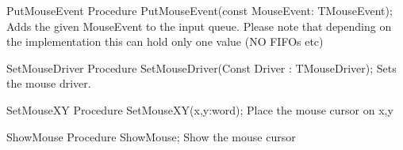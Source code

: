 \begin{procedure}{PutMouseEvent}
\Declaration
Procedure PutMouseEvent(const MouseEvent: TMouseEvent);
\Description
 { Adds the given MouseEvent to the input queue. Please note that depending on  the implementation this can hold only one value (NO FIFOs etc) }
\Errors
\SeeAlso
\end{procedure}

\begin{procedure}{SetMouseDriver}
\Declaration
Procedure SetMouseDriver(Const Driver : TMouseDriver);
\Description
 { Sets the mouse driver. }
\Errors
\SeeAlso
\end{procedure}

\begin{procedure}{SetMouseXY}
\Declaration
Procedure SetMouseXY(x,y:word); 
\Description
{ Place the mouse cursor on x,y }
\Errors
\SeeAlso
\end{procedure}

\begin{procedure}{ShowMouse}
\Declaration
Procedure ShowMouse; 
\Description
{ Show the mouse cursor }
\Errors
\SeeAlso
\end{procedure}
